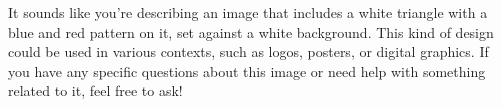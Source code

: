 It sounds like you're describing an image that includes a white triangle with a blue and red pattern on it, set against a white background. This kind of design could be used in various contexts, such as logos, posters, or digital graphics. If you have any specific questions about this image or need help with something related to it, feel free to ask!